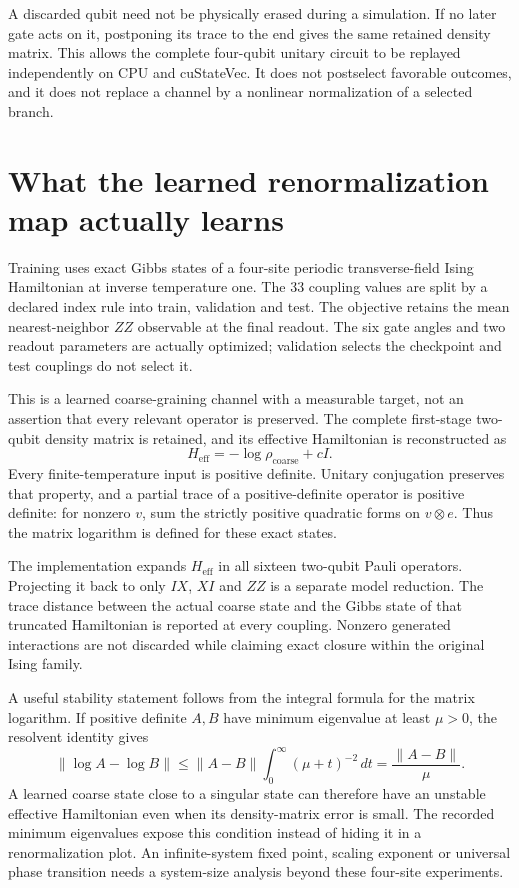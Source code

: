 A discarded qubit need not be physically erased during a simulation. If no later gate acts on it, postponing its trace to the end gives the same retained density matrix. This allows the complete four-qubit unitary circuit to be replayed independently on CPU and cuStateVec. It does not postselect favorable outcomes, and it does not replace a channel by a nonlinear normalization of a selected branch.

\section{What the learned renormalization map actually learns}

Training uses exact Gibbs states of a four-site periodic transverse-field Ising Hamiltonian at inverse temperature one. The 33 coupling values are split by a declared index rule into train, validation and test. The objective retains the mean nearest-neighbor $ZZ$ observable at the final readout. The six gate angles and two readout parameters are actually optimized; validation selects the checkpoint and test couplings do not select it.

\begin{center}\small\end{center}

This is a learned coarse-graining channel with a measurable target, not an assertion that every relevant operator is preserved. The complete first-stage two-qubit density matrix is retained, and its effective Hamiltonian is reconstructed as
\[
 H_{\mathrm{eff}}=-\log\rho_{\mathrm{coarse}}+cI.
\]
Every finite-temperature input is positive definite. Unitary conjugation preserves that property, and a partial trace of a positive-definite operator is positive definite: for nonzero $v$, sum the strictly positive quadratic forms on $v\otimes e$. Thus the matrix logarithm is defined for these exact states.

The implementation expands $H_{\mathrm{eff}}$ in all sixteen two-qubit Pauli operators. Projecting it back to only $IX$, $XI$ and $ZZ$ is a separate model reduction. The trace distance between the actual coarse state and the Gibbs state of that truncated Hamiltonian is reported at every coupling. Nonzero generated interactions are not discarded while claiming exact closure within the original Ising family.

A useful stability statement follows from the integral formula for the matrix logarithm. If positive definite $A,B$ have minimum eigenvalue at least $\mu>0$, the resolvent identity gives
\[
 \|\log A-\log B\|\le
 \|A-B\|\int_0^\infty(\mu+t)^{-2}\,dt
 =\frac{\|A-B\|}{\mu}.
\]
A learned coarse state close to a singular state can therefore have an unstable effective Hamiltonian even when its density-matrix error is small. The recorded minimum eigenvalues expose this condition instead of hiding it in a renormalization plot. An infinite-system fixed point, scaling exponent or universal phase transition needs a system-size analysis beyond these four-site experiments.

